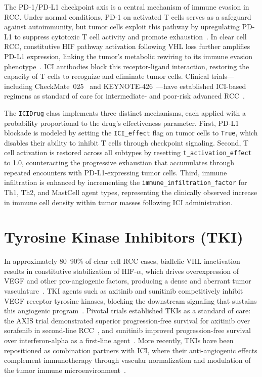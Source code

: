 The PD-1/PD-L1 checkpoint axis is a central mechanism of immune evasion in RCC. Under normal conditions, PD-1 on activated T cells serves as a safeguard against autoimmunity, but tumor cells exploit this pathway by upregulating PD-L1 to suppress cytotoxic T cell activity and promote exhaustion~\cite{Sharpe2018}. In clear cell RCC, constitutive HIF pathway activation following VHL loss further amplifies PD-L1 expression, linking the tumor's metabolic rewiring to its immune evasion phenotype~\cite{rini2019}. ICI antibodies block this receptor-ligand interaction, restoring the capacity of T cells to recognize and eliminate tumor cells. Clinical trials---including CheckMate~025~\cite{Motzer2015} and KEYNOTE-426~\cite{rini2019}---have established ICI-based regimens as standard of care for intermediate- and poor-risk advanced RCC~\cite{Motzer2018}.

The \texttt{ICIDrug} class implements three distinct mechanisms, each applied with a probability proportional to the drug's effectiveness parameter. First, PD-L1 blockade is modeled by setting the \texttt{ICI\_effect} flag on tumor cells to \texttt{True}, which disables their ability to inhibit T cells through checkpoint signaling. Second, T cell activation is restored across all subtypes by resetting \texttt{t\_activation\_effect} to 1.0, counteracting the progressive exhaustion that accumulates through repeated encounters with PD-L1-expressing tumor cells. Third, immune infiltration is enhanced by incrementing the \texttt{immune\_infiltration\_factor} for Th1, Th2, and MastCell agent types, representing the clinically observed increase in immune cell density within tumor masses following ICI administration.

\section{Tyrosine Kinase Inhibitors (TKI)}
\label{sec:tki}

In approximately 80--90\% of clear cell RCC cases, biallelic VHL inactivation results in constitutive stabilization of HIF-$\alpha$, which drives overexpression of VEGF and other pro-angiogenic factors, producing a dense and aberrant tumor vasculature~\cite{Hsieh2017}. TKI agents such as axitinib and sunitinib competitively inhibit VEGF receptor tyrosine kinases, blocking the downstream signaling that sustains this angiogenic program~\cite{Choueiri2020}. Pivotal trials established TKIs as a standard of care: the AXIS trial demonstrated superior progression-free survival for axitinib over sorafenib in second-line RCC~\cite{Rini2011}, and sunitinib improved progression-free survival over interferon-alpha as a first-line agent~\cite{Motzer2007}. More recently, TKIs have been repositioned as combination partners with ICI, where their anti-angiogenic effects complement immunotherapy through vascular normalization and modulation of the tumor immune microenvironment~\cite{Choueiri2020}.

